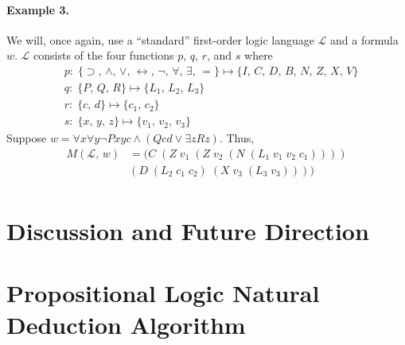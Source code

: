 \documentclass[ms]{uncgdissertationexp2}
\theoremstyle{plain}
\theoremstyle{definition}
\theoremstyle{remark}
\begin{document}
\subsubsection{Example 3.} We will, once again, use a ``standard'' first-order logic language $\mathcal{L}$ and a formula $w$. $\mathcal{L}$ consists of the four functions $p$, $q$, $r$, and $s$ where
\begin{align*}
    &p:\;\{\supset,\,\land,\,\lor,\,\leftrightarrow,\,\lnot,\,\forall,\,\exists,\,=\}\mapsto \{I,\,C,\,D,\,B,\,N,\,Z,\,X,\,V\}\\
    &q:\;\{P,\,Q,\,R\} \mapsto \{L_{1},\,L_{2},\,L_{3}\}\\
    &r:\;\{c,\,d\} \mapsto \{c_1,\,c_2\}\\
    &s:\;\{x,\,y,\,z\} \mapsto \{v_1,\,v_2,\,v_3\}
\end{align*}
Suppose $w = \forall{x}\forall{y}\lnot{Pxyc} \land (Qcd \lor \exists{z}Rz)$. Thus,
\begin{align*}
    M(\mathcal{L},\,w) &= (C\;(Z\;v_1\;(Z\;v_2\;(N\;(L_1\;v_1\;v_2\;c_1))))\\
    &(D\;(L_2\;c_1\;c_2)\;(X\;v_3\;(L_3\;v_3))))\\
\end{align*}

\chapter{Discussion and Future Direction}




\nocite{*}

\appendix
\chapter{Propositional Logic Natural Deduction Algorithm}
\end{document}
